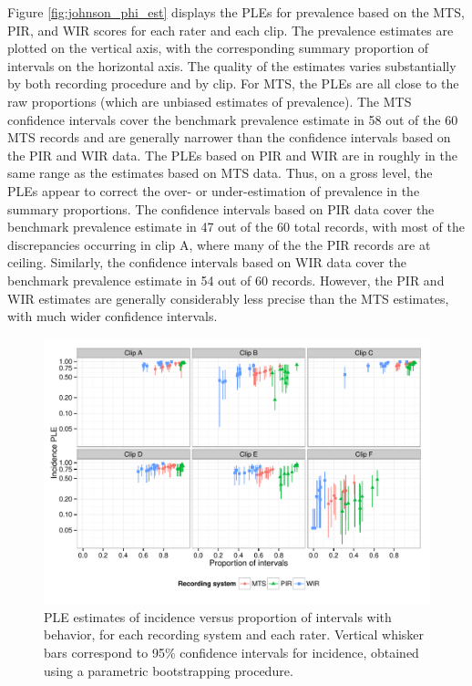 \documentclass[man, noextraspace, floatsintext]{apa6}\usepackage[]{graphicx}\usepackage[]{color}
\makeatletter
\def\maxwidth{ %
  \ifdim\Gin@nat@width>\linewidth
    \linewidth
  \else
    \Gin@nat@width
  \fi
}
\newenvironment{knitrout}{}{} %
\makeatother
\begin{document}
Figure \ref{fig:johnson_phi_est} displays the PLEs for prevalence based on the MTS, PIR, and WIR scores for each rater and each clip. 
The prevalence estimates are plotted on the vertical axis, with the corresponding summary proportion of intervals on the horizontal axis. 
The quality of the estimates varies substantially by both recording procedure and by clip. 
For MTS, the PLEs are all close to the raw proportions (which are unbiased estimates of prevalence). 
The MTS confidence intervals cover the benchmark prevalence estimate in 58 out of the 60 MTS records and are generally narrower than the confidence intervals based on the PIR and WIR data.
The PLEs based on PIR and WIR are in roughly in the same range as the estimates based on MTS data. 
Thus, on a gross level, the PLEs appear to correct the over- or under-estimation of prevalence in the summary proportions. 
The confidence intervals based on PIR data cover the benchmark prevalence estimate in 47 out of the 60 total records, with most of the discrepancies occurring in clip A, where many of the the PIR records are at ceiling. 
Similarly, the confidence intervals based on WIR data cover the benchmark prevalence estimate in 54 out of 60 records. 
However, the PIR and WIR estimates are generally considerably less precise than the MTS estimates, with much wider confidence intervals.

\begin{knitrout}
\color{fgcolor}\begin{figure}[tb]


{\centering \includegraphics[width=\maxwidth]{fig/johnson_zeta_est} 

}

\caption[PLE estimates of incidence versus proportion of intervals with behavior, for each recording system and each rater]{PLE estimates of incidence versus proportion of intervals with behavior, for each recording system and each rater. Vertical whisker bars correspond to 95\% confidence intervals for incidence, obtained using a parametric bootstrapping procedure.\label{fig:johnson_zeta_est}}
\end{figure}


\end{knitrout}
\end{document}
